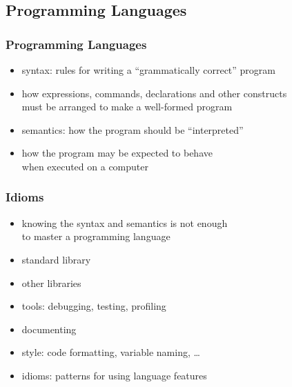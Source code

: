 \documentclass[dvipsnames]{beamer}
\theoremstyle{plain}
\begin{document}
\lstset{language=python}

\subsection{Programming Languages}

\begin{frame}
  \frametitle{Programming Languages}

  \begin{itemize}
    \item \alert{syntax}: rules for writing a ``grammatically correct'' program
    \item how expressions, commands, declarations and other constructs\\
      must be arranged to make a well-formed program

    \pause
    \bigskip
    \item \alert{semantics}: how the program should be ``interpreted''
    \item how the program may be expected to behave\\
      when executed on a computer
  \end{itemize}
\end{frame}

\begin{frame}
  \frametitle{Idioms}

  \begin{itemize}
    \item knowing the syntax and semantics is not enough\\
      to master a programming language

    \medskip
    \item standard library
    \item other libraries
    \item tools: debugging, testing, profiling
    \item documenting
    \item style: code formatting, variable naming, \ldots

    \pause
    \medskip
    \item idioms: patterns for using language features
  \end{itemize}
\end{frame}
\end{document}
